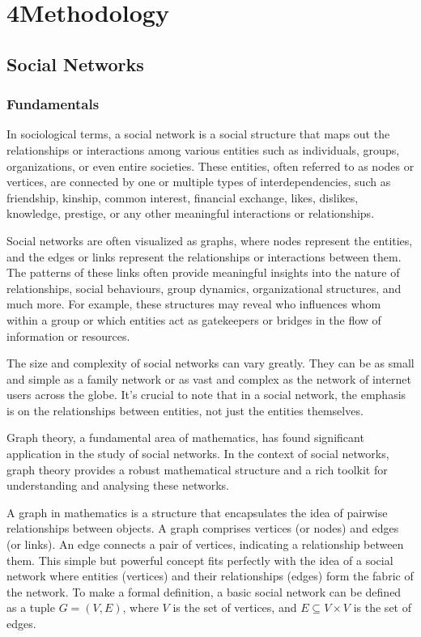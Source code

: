 \chapter{4\quad Methodology}
\label{ch:methods}

\section{Social Networks}
\label{sec:social_networks}

\subsection{Fundamentals}
\label{sec:social_networks_fundamentals}

In sociological terms, a social network is a social structure that maps out the relationships or interactions among various entities such as individuals, groups, organizations, or even entire societies. These entities, often referred to as nodes or vertices, are connected by one or multiple types of interdependencies, such as friendship, kinship, common interest, financial exchange, likes, dislikes, knowledge, prestige, or any other meaningful interactions or relationships.

Social networks are often visualized as graphs, where nodes represent the entities, and the edges or links represent the relationships or interactions between them. The patterns of these links often provide meaningful insights into the nature of relationships, social behaviours, group dynamics, organizational structures, and much more. For example, these structures may reveal who influences whom within a group or which entities act as gatekeepers or bridges in the flow of information or resources.

The size and complexity of social networks can vary greatly. They can be as small and simple as a family network or as vast and complex as the network of internet users across the globe. It's crucial to note that in a social network, the emphasis is on the relationships between entities, not just the entities themselves.

Graph theory, a fundamental area of mathematics, has found significant application in the study of social networks. In the context of social networks, graph theory provides a robust mathematical structure and a rich toolkit for understanding and analysing these networks.

A graph in mathematics is a structure that encapsulates the idea of pairwise relationships between objects. A graph comprises vertices (or nodes) and edges (or links). An edge connects a pair of vertices, indicating a relationship between them. This simple but powerful concept fits perfectly with the idea of a social network where entities (vertices) and their relationships (edges) form the fabric of the network. To make a formal definition, a basic social network can be defined as a tuple $G = (V,E)$, where $V$ is the set of vertices, and $E \subseteq V \times V$ is the set of edges.

